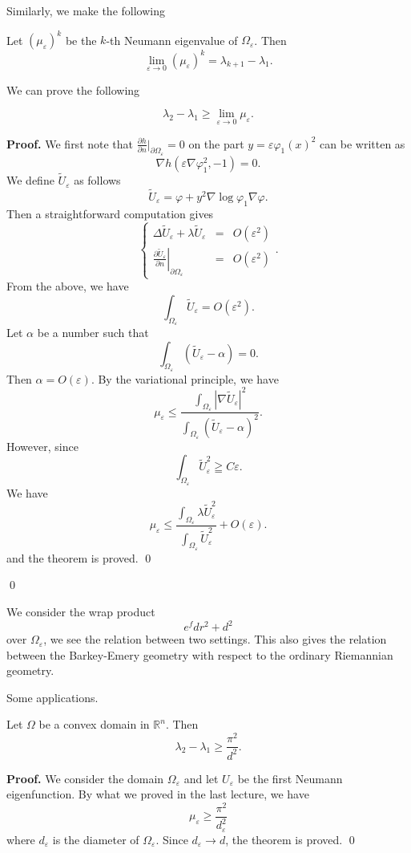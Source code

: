 Similarly, we make the following
\begin{conjecture}
Let $(\mu_\varepsilon)^k$ be the $k$-th Neumann eigenvalue of 
$\Omega_\varepsilon$. Then
\[
\lim_{\varepsilon\rightarrow 0}(\mu_\varepsilon)^k = \lambda_{k+1} - \lambda_1.
\]
\end{conjecture}

We can prove the following
\begin{theorem}
\[
\lambda_2 - \lambda_1 \geqslant \lim_{\varepsilon\rightarrow 0}\mu_\varepsilon.
\]
\end{theorem}
{\bf Proof.}
We first note that 
$\frac{\partial h}{\partial n}|_{\partial\Omega_\varepsilon} = 0$ on the part
$y = \varepsilon\varphi_1(x)^2$ can be written as
\[
\nabla h(\varepsilon\nabla\varphi_1^2, -1) = 0.
\]
We define $\widetilde{U}_\varepsilon$ as follows
\[
\widetilde{U}_\varepsilon = \varphi + y^2 \nabla\log\varphi_1\nabla\varphi.
\]
Then a straightforward computation gives
\[
\left\{\begin{array}{rcl}
\Delta\widetilde{U}_\varepsilon + \lambda\widetilde{U}_\varepsilon & = &
O(\varepsilon^2) \\
\left.\frac{\partial\widetilde{U}_\varepsilon}{\partial n}
\right|_{\partial\Omega_\varepsilon} & = & O(\varepsilon^2)
\end{array}
\right..
\]
From the above, we have
\[
\int_{\Omega_\varepsilon}\widetilde{U}_\varepsilon = O(\varepsilon^2).
\]
Let $\alpha$ be a number such that
\[
\int_{\Omega_\varepsilon}(\widetilde{U}_\varepsilon - \alpha) = 0.
\]
Then $\alpha = O(\varepsilon)$. By the variational principle, we have
\[
\mu_\varepsilon \leqslant 
\frac{\int_{\Omega_\varepsilon}|\nabla\widetilde{U}_\varepsilon|^2}
{\int_{\Omega_\varepsilon}(\widetilde{U}_\varepsilon - \alpha)^2}.
\]
However, since
\[
\int_{\Omega_\varepsilon}\widetilde{U}_\varepsilon^2 \geqq C\varepsilon.
\]
We have
\[
\mu_\varepsilon \leqslant 
\frac{\int_{\Omega_\varepsilon}\lambda\widetilde{U}_\varepsilon^2}
{\int_{\Omega_\varepsilon}\widetilde{U}_\varepsilon^2} + O(\varepsilon).
\]
and the theorem is proved.
\qed


\qed


\begin{remark}
We consider the wrap product
\[
e^f dr^2 + d^2
\]
over $\Omega_\varepsilon$, we see the relation between two settings. This also
gives the relation between the Barkey-Emery geometry with respect to the
ordinary Riemannian geometry.
\end{remark}

Some applications.
\begin{theorem}
 Let $\Omega$ be a convex domain in $\mathbb{R}^n$. Then
\[
\lambda_2 - \lambda_1 \geqslant \frac{\pi^2}{d^2}.
\]
\end{theorem}
{\bf Proof.}
We consider the domain $\Omega_\varepsilon$ and let $U_\varepsilon$ be the first
Neumann eigenfunction. By what we proved in the last lecture, we have
\[
\mu_\varepsilon \geqslant \frac{\pi^2}{d_\varepsilon^2}
\]
where $d_\varepsilon$ is the diameter of $\Omega_\varepsilon$. Since 
$d_\varepsilon\rightarrow d$, the theorem is proved.
\qed

